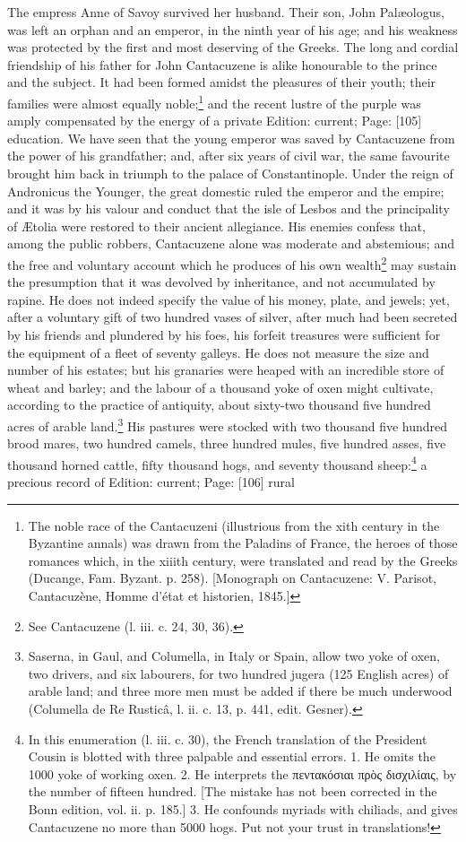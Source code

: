 The empress Anne of Savoy survived her husband. Their son, John Palæologus, was left an orphan and an emperor, in the ninth year of his age; and his weakness was protected by the first and most deserving of the Greeks. The long and cordial friendship of his father for John Cantacuzene is alike honourable to the prince and the subject. It had been formed amidst the pleasures of their youth; their families were almost equally noble;\footnote{The noble race of the Cantacuzeni (illustrious from the xith century in the Byzantine annals) was drawn from the Paladins of France, the heroes of those romances which, in the xiiith century, were translated and read by the Greeks (Ducange, Fam. Byzant. p. 258). [Monograph on Cantacuzene: V. Parisot, Cantacuzène, Homme d\texthebrew{}’état et historien, 1845.]} and the recent lustre of the purple was amply compensated by the energy of a private Edition: current; Page: [105] education. We have seen that the young emperor was saved by Cantacuzene from the power of his grandfather; and, after six years of civil war, the same favourite brought him back in triumph to the palace of Constantinople. Under the reign of Andronicus the Younger, the great domestic ruled the emperor and the empire; and it was by his valour and conduct that the isle of Lesbos and the principality of Ætolia were restored to their ancient allegiance. His enemies confess that, among the public robbers, Cantacuzene alone was moderate and abstemious; and the free and voluntary account which he produces of his own wealth\footnote{See Cantacuzene (l. iii. c. 24, 30, 36).} may sustain the presumption that it was devolved by inheritance, and not accumulated by rapine. He does not indeed specify the value of his money, plate, and jewels; yet, after a voluntary gift of two hundred vases of silver, after much had been secreted by his friends and plundered by his foes, his forfeit treasures were sufficient for the equipment of a fleet of seventy galleys. He does not measure the size and number of his estates; but his granaries were heaped with an incredible store of wheat and barley; and the labour of a thousand yoke of oxen might cultivate, according to the practice of antiquity, about sixty-two thousand five hundred acres of arable land.\footnote{Saserna, in Gaul, and Columella, in Italy or Spain, allow two yoke of oxen, two drivers, and six labourers, for two hundred jugera (125 English acres) of arable land; and three more men must be added if there be much underwood (Columella de Re Rusticâ, l. ii. c. 13, p. 441, edit. Gesner).} His pastures were stocked with two thousand five hundred brood mares, two hundred camels, three hundred mules, five hundred asses, five thousand horned cattle, fifty thousand hogs, and seventy thousand sheep:\footnote{In this enumeration (l. iii. c. 30), the French translation of the President Cousin is blotted with three palpable and essential errors. 1. He omits the 1000 yoke of working oxen. 2. He interprets the \textgreek{πεντακόσιαι πρ\texthebrew{ὸ}ς δισχιλίαις}, by the number of fifteen hundred. [The mistake has not been corrected in the Bonn edition, vol. ii. p. 185.] 3. He confounds myriads with chiliads, and gives Cantacuzene no more than 5000 hogs. Put not your trust in translations!} a precious record of Edition: current; Page: [106] rural 